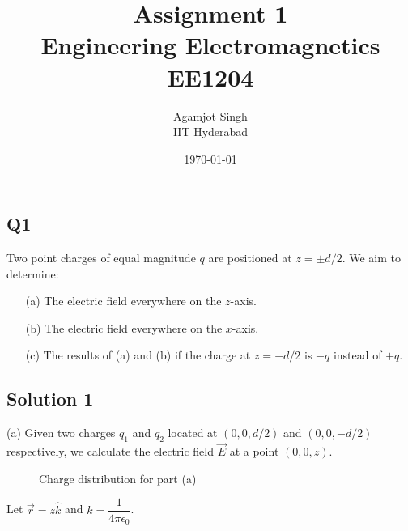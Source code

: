 \documentclass[12pt]{article}
\title{Assignment 1\\Engineering Electromagnetics EE1204}
\author{Agamjot Singh \brak{\text{EE24BTECH11002}}\\IIT Hyderabad}
\date{\today}
\begin{document}
\maketitle

\subsection*{Q1}
    Two point charges of equal magnitude $q$ are positioned at $z = \pm d/2$. We aim to determine:
    \begin{enumerate}
        \item[(a)] The electric field everywhere on the $z$-axis.
        \item[(b)] The electric field everywhere on the $x$-axis.
        \item[(c)] The results of (a) and (b) if the charge at $z = -d/2$ is $-q$ instead of $+q$.
    \end{enumerate}

\subsection*{Solution 1}
(a) Given two charges $q_1$ and $q_2$ located at $(0,0,d/2)$ and $(0,0,-d/2)$ respectively, we calculate the electric field $\vec{E}$ at a point $(0,0,z)$.

\begin{figure}[!ht]
    \centering

        \label{fig:my_label}
        \caption{Charge distribution for part (a)}
\end{figure}
Let $\vec{r} = z \hat{k}$ and $k = \dfrac{1}{4 \pi \epsilon_0}$.
\end{document}
